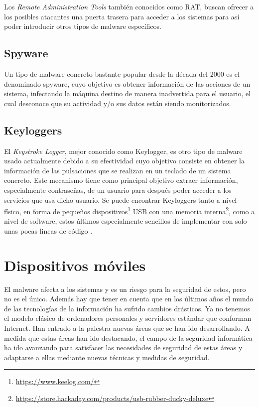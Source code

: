 Los \textit{Remote Administration Tools} también conocidos como RAT, buscan ofrecer a los posibles atacantes una puerta trasera para acceder a los sistemas para así poder introducir otros tipos de malware específicos.

\subsection{Spyware}

Un tipo de malware concreto bastante popular desde la década del 2000 es el denominado spyware, cuyo objetivo es obtener información de las acciones de un sistema, infectando la máquina destino de manera inadvertida para el usuario, el cual desconoce que su actividad y/o sus datos están siendo monitorizados.

\subsection{Keyloggers}

El \textit{Keystroke Logger}, mejor conocido como Keylogger, es otro tipo de malware usado actualmente debido a su efectividad cuyo objetivo consiste en obtener la información de las pulsaciones que se realizan en un teclado de un sistema concreto. Este mecanismo tiene como principal objetivo extraer información, especialmente contraseñas, de un usuario para después poder acceder a los servicios que usa dicho usuario. Se puede encontrar Keyloggers tanto a nivel físico, en forma de pequeños dispositivos\footnote{\url{https://www.keelog.com/}} USB con una memoria interna\footnote{\url{https://store.hackaday.com/products/usb-rubber-ducky-deluxe}}, como a nivel de software, estos últimos especialmente sencillos de implementar con solo unas pocas lineas de código \cite{ander-keylogger}.


\section{Dispositivos móviles}

El malware afecta a los sistemas y es un riesgo para la seguridad de estos, pero no es el único. Además hay que tener en cuenta que en los últimos años el mundo de las tecnologías de la información ha sufrido cambios drásticos. Ya no tenemos el modelo clásico de ordenadores personales y servidores estándar que conforman Internet. Han entrado a la palestra nuevas áreas que se han ido desarrollando. A medida que estas áreas han ido destacando, el campo de la seguridad informática ha ido avanzando para satisfacer las necesidades de seguridad de estas áreas y adaptarse a ellas mediante nuevas técnicas y medidas de seguridad.

